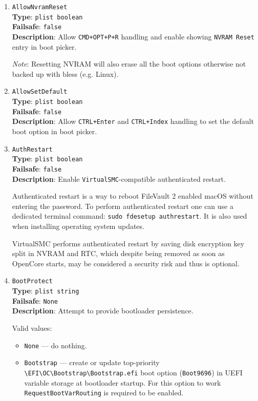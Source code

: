 \documentclass[]{article}
\providecommand{\tightlist}{%
  \setlength{\itemsep}{0pt}\setlength{\parskip}{0pt}}
\begin{document}
\begin{enumerate}

\item
  \texttt{AllowNvramReset}\\
  \textbf{Type}: \texttt{plist\ boolean}\\
  \textbf{Failsafe}: \texttt{false}\\
  \textbf{Description}: Allow \texttt{CMD+OPT+P+R} handling and enable
  showing \texttt{NVRAM Reset} entry in boot picker.

  \emph{Note}: Resetting NVRAM will also erase all the boot options
  otherwise not backed up with bless (e.g. Linux).

\item
  \texttt{AllowSetDefault}\\
  \textbf{Type}: \texttt{plist\ boolean}\\
  \textbf{Failsafe}: \texttt{false}\\
  \textbf{Description}: Allow \texttt{CTRL+Enter} and \texttt{CTRL+Index} handling
  to set the default boot option in boot picker.

\item
  \texttt{AuthRestart}\\
  \textbf{Type}: \texttt{plist\ boolean}\\
  \textbf{Failsafe}: \texttt{false}\\
  \textbf{Description}: Enable \texttt{VirtualSMC}-compatible authenticated restart.

  Authenticated restart is a way to reboot FileVault 2 enabled macOS without entering
  the password. To perform authenticated restart one can use a dedicated terminal
  command: \texttt{sudo fdesetup authrestart}. It is also used when installing
  operating system updates.

  VirtualSMC performs authenticated restart by saving disk encryption key split in
  NVRAM and RTC, which despite being removed as soon as OpenCore starts, may be
  considered a security risk and thus is optional.

\item
  \texttt{BootProtect}\\
  \textbf{Type}: \texttt{plist\ string}\\
  \textbf{Failsafe}: \texttt{None}\\
  \textbf{Description}: Attempt to provide bootloader persistence.

  Valid values:

  \begin{itemize}
  \tightlist
  \item \texttt{None} --- do nothing.
  \item \texttt{Bootstrap} --- create or update top-priority
  \texttt{\textbackslash EFI\textbackslash OC\textbackslash Bootstrap\textbackslash Bootstrap.efi}
  boot option (\texttt{Boot9696}) in UEFI variable storage at bootloader startup. For this option
  to work \texttt{RequestBootVarRouting} is required to be enabled.
  \end{itemize}


\end{enumerate}
\end{document}
